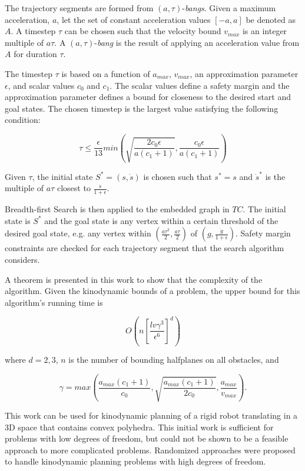 The trajectory segments are formed from $(a, \tau)$-\emph{bangs}. Given a maximum acceleration, $a$, let the set of constant acceleration values $[-a,a]$ be denoted as $A$. A timestep $\tau$ can be chosen such that the velocity bound $v_{max}$ is an integer multiple of $a\tau$. A $(a, \tau)$-\emph{bang} is the result of applying an acceleration value from $A$ for duration $\tau$. 

The timestep $\tau$ is based on a function of $a_{max}$, $v_{max}$, an approximation parameter $\epsilon$, and scalar values $c_0$ and $c_1$. The scalar values define a safety margin and the approximation parameter defines a bound for closeness to the desired start and goal states. The chosen timestep is the largest value satisfying the following condition:

\begin{equation}
\tau \leq \frac{\epsilon}{13} min\left( \sqrt{ \frac{2c_0\epsilon}{a(c_1+1)}}, \frac{c_0\epsilon}{a(c_1+1)}\right)
\end{equation}

Given $\tau$, the initial state $S^*=(s, \dot{s})$ is chosen such that $s^* = s$ and $\dot{s}^*$ is the multiple of $a\tau$ closest to $\frac{\dot{s}}{1+\epsilon}$. 

Breadth-first Search is then applied to the embedded graph in $TC$. The initial state is $S^*$ and the goal state is any vertex within a certain threshold of the desired goal state, e.g. any vertex within $\left( \frac{a\tau^2}{2}, \frac{a\tau}{2} \right)$ of $\left(g, \frac{\dot{g}}{1+\epsilon}\right)$. Safety margin constraints are checked for each trajectory segment that the search algorithm considers.


A theorem is presented in this work to show that the complexity of the algorithm. Given the kinodynamic bounds of a problem, the upper bound for this algorithm's running time is


\begin{equation}
O\left( n \left[ \frac{lv\gamma^3}{\epsilon^6} \right] ^d \right)
\end{equation}

where $d=2,3$, $n$ is the number of bounding halfplanes on all obstacles, and 

\begin{equation}
\gamma = max \left( \frac{a_{max}(c_1+1)}{c_0}, \sqrt{ \frac{a_{max}(c_1+1)}{2c_0} }, \frac{a_{max}}{v_{max}}\right).
\end{equation}


This work can be used for kinodynamic planning of a rigid robot translating in a 3D space that contains convex polyhedra. This initial work is sufficient for problems with low degrees of freedom, but could not be shown to be a feasible approach to more complicated problems. Randomized approaches were proposed to handle kinodynamic planning problems with high degrees of freedom.

